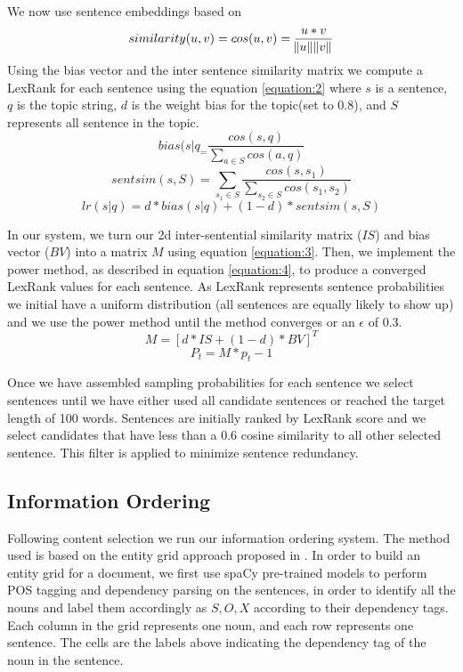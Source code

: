\documentclass[11pt,a4paper]{article}
\begin{document}
We now use sentence embeddings based on \cite{reimers-2019-sentence-bert}
\begin{equation}
\label{equation:1}
similarity(u,v) = cos(u,v) = \frac{u * v}{\norm{u}\norm{v}}
\end{equation}
Using the bias vector and the inter sentence similarity matrix we compute a LexRank for each sentence using the equation \ref{equation:2} where $s$ is a sentence, $q$ is the topic string, $d$ is the weight bias for the topic(set to 0.8), and $S$ represents all sentence in the topic. 
\begin{equation}
   bias(s|q_ =  \frac{cos(s,q)}{\sum_{a \in S} cos(a,q) }
\end{equation}
\begin{equation}
    sentsim(s,S) = \sum_{s_1 \in S} \frac{cos(s,s_1)}{\sum_{s_2 \in S} cos(s_1,s_2) }
\end{equation}
\begin{equation}
\label{equation:2}
lr(s|q) = d * bias(s|q) + (1-d) * sentsim(s,S)
\end{equation}

In our system, we turn our 2d inter-sentential similarity matrix ($IS$) and bias vector ($BV$) into a matrix $M$ using equation \ref{equation:3}.  Then, we implement the power method, as described in equation \ref{equation:4}, to produce a converged LexRank values for each sentence. As LexRank represents sentence probabilities we initial have a uniform distribution (all sentences are equally likely to show up) and we use the power method until the method converges or an $\epsilon$ of 0.3.
\begin{equation}
\label{equation:3}
M = [d * IS + (1-d) * BV]^T
\end{equation}
\begin{equation}
\label{equation:4}
P_t = M * p_t-1
\end{equation}

Once we have assembled sampling probabilities for each sentence we select sentences until we have either used all candidate sentences or reached the target length of 100 words. Sentences are initially ranked by LexRank score and we select candidates that have less than a 0.6 cosine similarity to all other selected sentence. This filter is applied to minimize sentence redundancy. 
\subsection{Information Ordering}
Following content selection we run our information ordering system. The method used is based on the entity grid approach proposed in \citet{barzilay-lapata-2008-modeling}. In order to build an entity grid for a document, we first use spaCy pre-trained models to perform POS tagging and dependency parsing on the sentences, in order to identify all the nouns and label them accordingly as $S, O, X$ according to their dependency tags. Each column in the grid represents one noun, and each row represents one sentence. The cells are the labels above indicating the dependency tag of the noun in the sentence.
\end{document}
